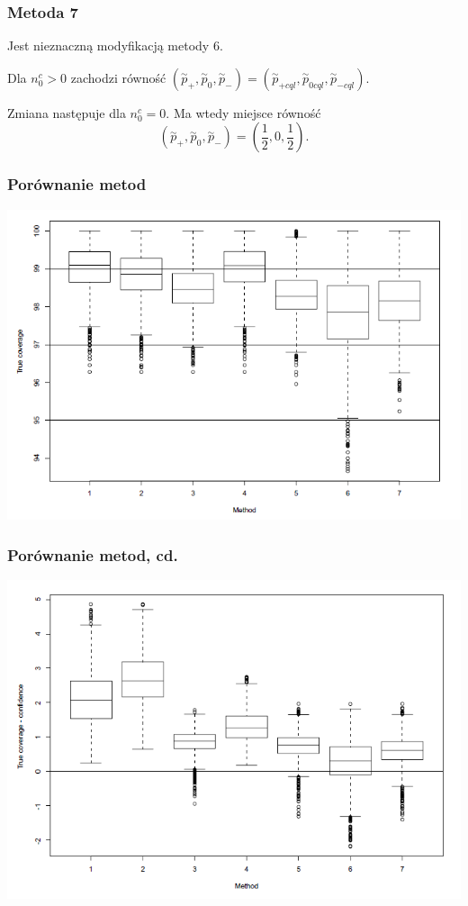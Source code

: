 \documentclass[11pt,usenames,dvipsnames,svgnames,x11names]{beamer}
\theoremstyle{plain}
\theoremstyle{definition}
\theoremstyle{remark}
\begin{document}
\begin{frame}
\frametitle{Metoda 7}
Jest nieznaczną modyfikacją metody 6. 

\bigskip

Dla $n_0^c > 0$ zachodzi równość $(\stackrel{\sim}{p}_+,\stackrel{\sim}{p}_0,\stackrel{\sim}{p}_-) = (\stackrel{\sim}{p}_{+cql},\stackrel{\sim}{p}_{0cql},\stackrel{\sim}{p}_{-cql})$.

\bigskip

Zmiana następuje dla $n_0^c = 0$. Ma wtedy miejsce równość$$(\stackrel{\sim}{p}_+,\stackrel{\sim}{p}_0,\stackrel{\sim}{p}_-) = \left( \dfrac{1}{2},0,\dfrac{1}{2} \right).$$

\end{frame}

\begin{frame}
\frametitle{Porównanie metod}
\includegraphics[width=\textwidth]{1.png}
\end{frame}

\begin{frame}
\frametitle{Porównanie metod, cd.}
\includegraphics[width=\textwidth]{2.png}
\end{frame}
\end{document}

